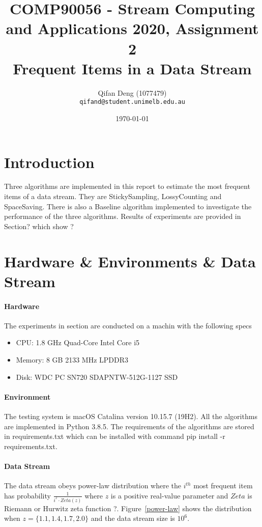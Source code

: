 \documentclass[10pt]{article}
\title{COMP90056 - Stream Computing and Applications 2020, Assignment 2 
\\Frequent Items in a Data Stream}
\author{
  Qifan Deng (1077479)\\
  \texttt{qifand@student.unimelb.edu.au} }
\date{\printdayoff\normalsize\today}
\begin{document}
\sloppy
\maketitle

\section{Introduction}
Three algorithms are implemented in this report to estimate the most frequent items of a data stream.
They are StickySampling, LossyCounting and SpaceSaving. 
There is also a Baseline algorithm implemented to investigate the performance of the three algorithms.
Results of experiments are provided in Section? which show ? 

\section{Hardware \& Environments \& Data Stream}

\paragraph{Hardware}
The experiments in section are conducted on a machin with the following specs
\begin{itemize}
     \setlength\itemsep{1pt}
       \item CPU: 1.8 GHz Quad-Core Intel Core i5
       \item Memory: 8 GB 2133 MHz LPDDR3
       \item Disk: WDC PC SN720 SDAPNTW-512G-1127 SSD
\end{itemize}
\paragraph{Environment}
The testing system is macOS Catalina version 10.15.7 (19H2).
All the algorithms are implemented in Python 3.8.5.
The requirements of the algorithms are stored in requirements.txt which can be installed with command pip install -r requirements.txt.

\paragraph{Data Stream}
The data stream obeys power-law distribution where 
the $i^{th}$ most frequent item has probability $\frac{1}{i^{z} \cdot{} Zeta(z)}$
where $z$ is a positive real-value parameter and $Zeta$ is Riemann or Hurwitz zeta function ?. 
Figure~\ref{power-law} shows the distribution when $z = \{1.1, 1.4, 1.7, 2.0\}$ and the data stream size is $10^6$.
\end{document}
